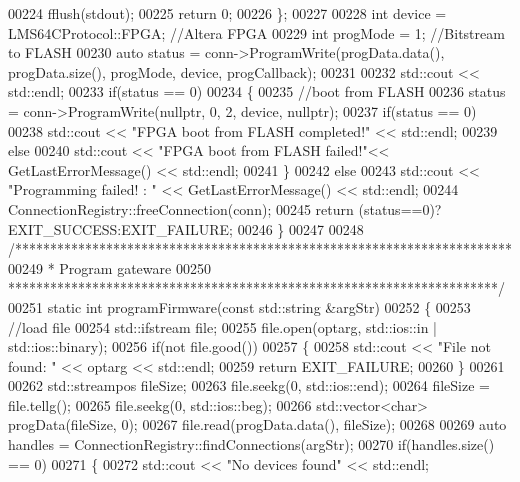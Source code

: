 \begin{DoxyCode}
{{00224         fflush(stdout);
00225         \textcolor{keywordflow}{return} 0;
00226     \};
00227 
00228     \textcolor{keywordtype}{int} device = LMS64CProtocol::FPGA; \textcolor{comment}{//Altera FPGA}
00229     \textcolor{keywordtype}{int} progMode = 1; \textcolor{comment}{//Bitstream to FLASH}
00230     \textcolor{keyword}{auto} status = conn->ProgramWrite(progData.data(), progData.size(), progMode, 
      device, progCallback);
00231 
00232     std::cout << std::endl;
00233     \textcolor{keywordflow}{if}(status == 0)
00234     \{
00235         \textcolor{comment}{//boot from FLASH}
00236         status = conn->ProgramWrite(\textcolor{keyword}{nullptr}, 0, 2, device, \textcolor{keyword}{nullptr});
00237         \textcolor{keywordflow}{if}(status == 0)
00238             std::cout << \textcolor{stringliteral}{"FPGA boot from FLASH completed!"} << std::endl;
00239         \textcolor{keywordflow}{else}
00240             std::cout << \textcolor{stringliteral}{"FPGA boot from FLASH failed!"}<< GetLastErrorMessage() << std::endl;
00241     \}
00242     \textcolor{keywordflow}{else}
00243         std::cout << \textcolor{stringliteral}{"Programming failed! : "} << GetLastErrorMessage() << std::endl;
00244     ConnectionRegistry::freeConnection(conn);
00245     \textcolor{keywordflow}{return} (status==0)?EXIT\_SUCCESS:EXIT\_FAILURE;
00246 \}
00247 
00248 \textcolor{comment}{/***********************************************************************}
00249 \textcolor{comment}{ * Program gateware}
00250 \textcolor{comment}{ **********************************************************************/}
00251 \textcolor{keyword}{static} \textcolor{keywordtype}{int} programFirmware(\textcolor{keyword}{const} std::string &argStr)
00252 \{
00253     \textcolor{comment}{//load file}
00254     std::ifstream file;
00255     file.open(optarg, std::ios::in | std::ios::binary);
00256     \textcolor{keywordflow}{if}(not file.good())
00257     \{
00258         std::cout << \textcolor{stringliteral}{"File not found: "} << optarg << std::endl;
00259         \textcolor{keywordflow}{return} EXIT\_FAILURE;
00260     \}
00261 
00262     std::streampos fileSize;
00263     file.seekg(0, std::ios::end);
00264     fileSize = file.tellg();
00265     file.seekg(0, std::ios::beg);
00266     std::vector<char> progData(fileSize, 0);
00267     file.read(progData.data(), fileSize);
00268 
00269     \textcolor{keyword}{auto} handles = ConnectionRegistry::findConnections(argStr);
00270     \textcolor{keywordflow}{if}(handles.size() == 0)
00271     \{
00272         std::cout << \textcolor{stringliteral}{"No devices found"} << std::endl;
}}
\end{DoxyCode}
